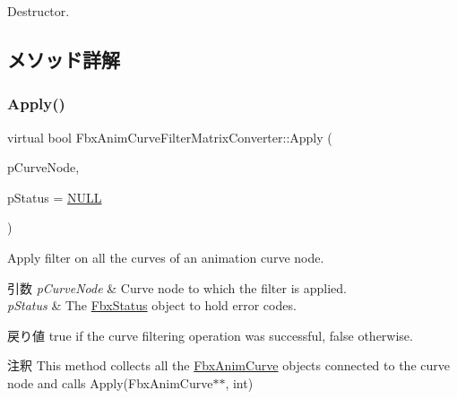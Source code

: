 Destructor. 



\subsection{メソッド詳解}
\mbox{\label{class_fbx_anim_curve_filter_matrix_converter_aa71462534eff53b1177aaa5bb3e059ec}} 
\subsubsection{\texorpdfstring{Apply()}{Apply()}\hspace{0.1cm}{\footnotesize\ttfamily [1/7]}}
{\footnotesize\ttfamily virtual bool Fbx\+Anim\+Curve\+Filter\+Matrix\+Converter\+::\+Apply (\begin{DoxyParamCaption}\item[{\hyperlink{class_fbx_anim_curve_node}{Fbx\+Anim\+Curve\+Node} \&}]{p\+Curve\+Node,  }\item[{\hyperlink{class_fbx_status}{Fbx\+Status} $\ast$}]{p\+Status = {\ttfamily \hyperlink{fbxarch_8h_a070d2ce7b6bb7e5c05602aa8c308d0c4}{N\+U\+LL}} }\end{DoxyParamCaption})\hspace{0.3cm}{\ttfamily [virtual]}}

Apply filter on all the curves of an animation curve node. 
\begin{DoxyParams}{引数}
{\em p\+Curve\+Node} & Curve node to which the filter is applied. \\
\hline
{\em p\+Status} & The \hyperlink{class_fbx_status}{Fbx\+Status} object to hold error codes. \\
\hline
\end{DoxyParams}
\begin{DoxyReturn}{戻り値}
{\ttfamily true} if the curve filtering operation was successful, {\ttfamily false} otherwise. 
\end{DoxyReturn}
\begin{DoxyRemark}{注釈}
This method collects all the \hyperlink{class_fbx_anim_curve}{Fbx\+Anim\+Curve} objects connected to the curve node and calls Apply(\+Fbx\+Anim\+Curve$\ast$$\ast$, int) 
\end{DoxyRemark}


